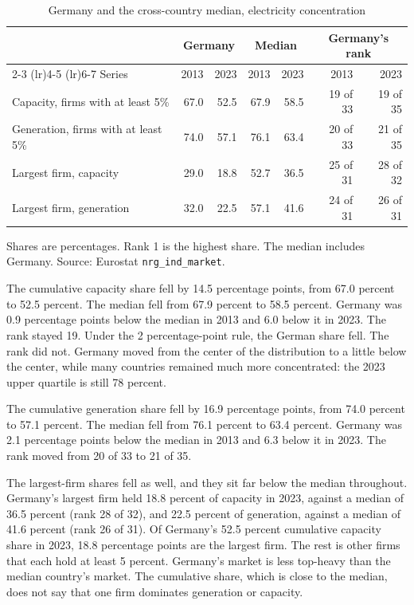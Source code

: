 \documentclass[11pt,a4paper]{article}
\begin{document}
\begin{table}[ht]
\centering
\caption{Germany and the cross-country median, electricity concentration}
\label{tab:rq1}
\small
\begin{tabular}{@{}lrrrrrr@{}}
\toprule
 & \multicolumn{2}{c}{Germany} & \multicolumn{2}{c}{Median} & \multicolumn{2}{c}{Germany's rank} \\
\cmidrule(lr){2-3} \cmidrule(lr){4-5} \cmidrule(lr){6-7}
Series & 2013 & 2023 & 2013 & 2023 & 2013 & 2023 \\
\midrule
Capacity, firms with at least 5\% & 67.0 & 52.5 & 67.9 & 58.5 & 19 of 33 & 19 of 35 \\
Generation, firms with at least 5\% & 74.0 & 57.1 & 76.1 & 63.4 & 20 of 33 & 21 of 35 \\
Largest firm, capacity & 29.0 & 18.8 & 52.7 & 36.5 & 25 of 31 & 28 of 32 \\
Largest firm, generation & 32.0 & 22.5 & 57.1 & 41.6 & 24 of 31 & 26 of 31 \\
\bottomrule
\end{tabular}

\vspace{0.4em}
\begin{minipage}{0.95\textwidth}
\footnotesize
Shares are percentages. Rank 1 is the highest share. The median includes Germany. Source: Eurostat \texttt{nrg\_ind\_market}.
\end{minipage}
\end{table}

The cumulative capacity share fell by 14.5 percentage points, from 67.0 percent to 52.5 percent. The median fell from 67.9 percent to 58.5 percent. Germany was 0.9 percentage points below the median in 2013 and 6.0 below it in 2023. The rank stayed 19. Under the 2 percentage-point rule, the German share fell. The rank did not. Germany moved from the center of the distribution to a little below the center, while many countries remained much more concentrated: the 2023 upper quartile is still 78 percent.

The cumulative generation share fell by 16.9 percentage points, from 74.0 percent to 57.1 percent. The median fell from 76.1 percent to 63.4 percent. Germany was 2.1 percentage points below the median in 2013 and 6.3 below it in 2023. The rank moved from 20 of 33 to 21 of 35.

The largest-firm shares fell as well, and they sit far below the median throughout. Germany's largest firm held 18.8 percent of capacity in 2023, against a median of 36.5 percent (rank 28 of 32), and 22.5 percent of generation, against a median of 41.6 percent (rank 26 of 31). Of Germany's 52.5 percent cumulative capacity share in 2023, 18.8 percentage points are the largest firm. The rest is other firms that each hold at least 5 percent. Germany's market is less top-heavy than the median country's market. The cumulative share, which is close to the median, does not say that one firm dominates generation or capacity.
\end{document}
